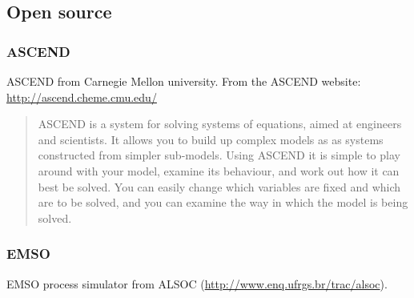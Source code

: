 \subsection{Open source}

\subsubsection{ASCEND}
ASCEND from Carnegie Mellon university.  From the ASCEND website: \url{http://ascend.cheme.cmu.edu/}
\begin{quote}
  ASCEND is a system for solving systems of equations, aimed at engineers and scientists. It allows you to build up complex models as as systems constructed from simpler sub-models. Using ASCEND it is simple to play around with your model, examine its behaviour, and work out how it can best be solved. You can easily change which variables are fixed and which are to be solved, and you can examine the way in which the model is being solved.
\end{quote}
\subsubsection{EMSO}
EMSO process simulator from ALSOC (\url{http://www.enq.ufrgs.br/trac/alsoc}).

